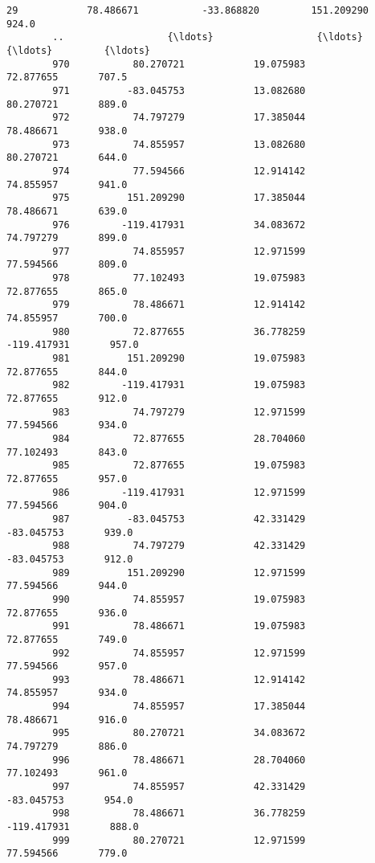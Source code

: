 \documentclass[11pt]{article}
\begin{document}
\begin{Verbatim}[commandchars=\\\{\}]
        29            78.486671           -33.868820         151.209290       924.0   
        ..                  {\ldots}                  {\ldots}                {\ldots}         {\ldots}   
        970           80.270721            19.075983          72.877655       707.5   
        971          -83.045753            13.082680          80.270721       889.0   
        972           74.797279            17.385044          78.486671       938.0   
        973           74.855957            13.082680          80.270721       644.0   
        974           77.594566            12.914142          74.855957       941.0   
        975          151.209290            17.385044          78.486671       639.0   
        976         -119.417931            34.083672          74.797279       899.0   
        977           74.855957            12.971599          77.594566       809.0   
        978           77.102493            19.075983          72.877655       865.0   
        979           78.486671            12.914142          74.855957       700.0   
        980           72.877655            36.778259        -119.417931       957.0   
        981          151.209290            19.075983          72.877655       844.0   
        982         -119.417931            19.075983          72.877655       912.0   
        983           74.797279            12.971599          77.594566       934.0   
        984           72.877655            28.704060          77.102493       843.0   
        985           72.877655            19.075983          72.877655       957.0   
        986         -119.417931            12.971599          77.594566       904.0   
        987          -83.045753            42.331429         -83.045753       939.0   
        988           74.797279            42.331429         -83.045753       912.0   
        989          151.209290            12.971599          77.594566       944.0   
        990           74.855957            19.075983          72.877655       936.0   
        991           78.486671            19.075983          72.877655       749.0   
        992           74.855957            12.971599          77.594566       957.0   
        993           78.486671            12.914142          74.855957       934.0   
        994           74.855957            17.385044          78.486671       916.0   
        995           80.270721            34.083672          74.797279       886.0   
        996           78.486671            28.704060          77.102493       961.0   
        997           74.855957            42.331429         -83.045753       954.0   
        998           78.486671            36.778259        -119.417931       888.0   
        999           80.270721            12.971599          77.594566       779.0   
        

\end{Verbatim}
\end{document}
